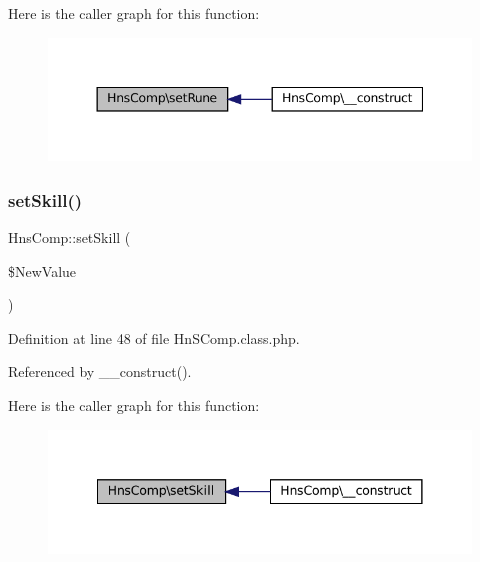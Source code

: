 Here is the caller graph for this function\+:\nopagebreak
\begin{figure}[H]
\begin{center}
\leavevmode
\includegraphics[width=344pt]{class_hns_comp_ae086dd8569732b25182a768ebdfef669_icgraph}
\end{center}
\end{figure}
\mbox{\label{class_hns_comp_a007a58a665b3f0f530b92b67e38f7eba}} 
\subsubsection{\texorpdfstring{set\+Skill()}{setSkill()}}
{\footnotesize\ttfamily Hns\+Comp\+::set\+Skill (\begin{DoxyParamCaption}\item[{}]{\$\+New\+Value }\end{DoxyParamCaption})}



Definition at line 48 of file Hn\+S\+Comp.\+class.\+php.



Referenced by \+\_\+\+\_\+construct().

Here is the caller graph for this function\+:\nopagebreak
\begin{figure}[H]
\begin{center}
\leavevmode
\includegraphics[width=341pt]{class_hns_comp_a007a58a665b3f0f530b92b67e38f7eba_icgraph}
\end{center}
\end{figure}
\mbox{\label{class_hns_comp_a3f3b116ce85376d1cfe61e2b2d1d72ac}} 
